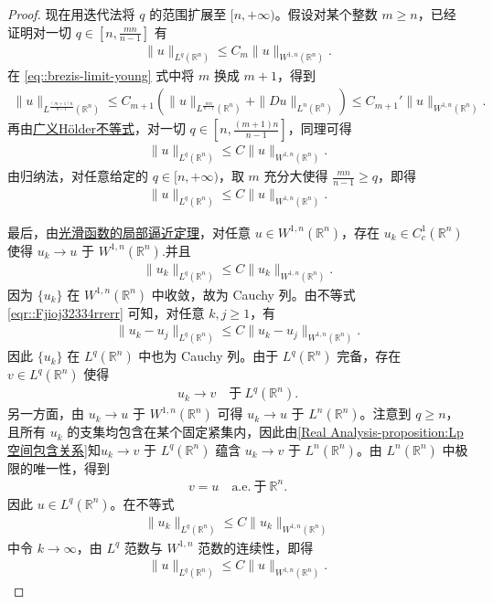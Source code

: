 \documentclass[../../main.tex]{subfiles}
\begin{document}
\begin{proof}
现在用迭代法将 $q$ 的范围扩展至 $[n, +\infty)$。假设对某个整数 $m \geqslant n$，已经证明对一切 $q \in \left[n, \frac{mn}{n-1}\right]$ 有
\begin{align*}
\|u\|_{L^q(\mathbb{R}^n)} \leqslant C_m\|u\|_{W^{1,n}(\mathbb{R}^n)}.
\end{align*}
在 \eqref{eq::brezis-limit-young} 式中将 $m$ 换成 $m+1$，得到
\begin{align*}
\|u\|_{L^{\frac{(m+1)n}{n-1}}(\mathbb{R}^n)} \leqslant C_{m+1}\left(\|u\|_{L^{\frac{mn}{n-1}}(\mathbb{R}^n)} + \|Du\|_{L^n(\mathbb{R}^n)}\right) \leqslant C_{m+1}'\|u\|_{W^{1,n}(\mathbb{R}^n)}.
\end{align*}
再由\hyperref[theorem:广义Holder不等式]{广义Hölder不等式}，对一切 $q \in \left[n, \frac{(m+1)n}{n-1}\right]$，同理可得
\begin{align*}
\|u\|_{L^q(\mathbb{R}^n)} \leqslant C\|u\|_{W^{1,n}(\mathbb{R}^n)}.
\end{align*}
由归纳法，对任意给定的 $q \in [n, +\infty)$，取 $m$ 充分大使得 $\frac{mn}{n-1} \geqslant q$，即得
\begin{align}\label{eq::brezis-limit-final}
\|u\|_{L^q(\mathbb{R}^n)} \leqslant C\|u\|_{W^{1,n}(\mathbb{R}^n)}.
\end{align}

最后，由\hyperref[theorem:ch05-光滑函数的局部逼近定理]{光滑函数的局部逼近定理}，对任意 $u \in W^{1,n}(\mathbb{R}^n)$，存在 $u_k \in C_c^1(\mathbb{R}^n)$ 使得 $u_k \to u$ 于 $W^{1,n}(\mathbb{R}^n)$.并且
\begin{align}\label{eqr::Fjioj32334rrerr}
\|u_k\|_{L^q(\mathbb{R}^n)} \leqslant C\|u_k\|_{W^{1,n}(\mathbb{R}^n)}.
\end{align}
因为 $\{u_k\}$ 在 $W^{1,n}(\mathbb{R}^n)$ 中收敛，故为 Cauchy 列。由不等式\eqref{eqr::Fjioj32334rrerr}
可知，对任意 $k,j \geqslant 1$，有
\begin{align*}
\|u_k - u_j\|_{L^q(\mathbb{R}^n)} \leqslant C\|u_k - u_j\|_{W^{1,n}(\mathbb{R}^n)}.
\end{align*}
因此 $\{u_k\}$ 在 $L^q(\mathbb{R}^n)$ 中也为 Cauchy 列。由于 $L^q(\mathbb{R}^n)$ 完备，存在 $v \in L^q(\mathbb{R}^n)$ 使得
\begin{align*}
u_k \to v \quad \text{于} \ L^q(\mathbb{R}^n).
\end{align*}
另一方面，由 $u_k \to u$ 于 $W^{1,n}(\mathbb{R}^n)$ 可得 $u_k \to u$ 于 $L^n(\mathbb{R}^n)$。注意到 $q \geqslant n$，且所有 $u_k$ 的支集均包含在某个固定紧集内，因此由\cref{Real Analysis-proposition:Lp空间包含关系}知$u_k \to v$ 于 $L^q(\mathbb{R}^n)$ 蕴含 $u_k \to v$ 于 $L^n(\mathbb{R}^n)$。由 $L^n(\mathbb{R}^n)$ 中极限的唯一性，得到
\begin{align*}
v = u \quad \text{a.e.} \ \text{于} \ \mathbb{R}^n.
\end{align*}
因此 $u \in L^q(\mathbb{R}^n)$。在不等式
\begin{align*}
\|u_k\|_{L^q(\mathbb{R}^n)} \leqslant C\|u_k\|_{W^{1,n}(\mathbb{R}^n)}
\end{align*}
中令 $k \to \infty$，由 $L^q$ 范数与 $W^{1,n}$ 范数的连续性，即得
\begin{align*}
\|u\|_{L^q(\mathbb{R}^n)} \leqslant C\|u\|_{W^{1,n}(\mathbb{R}^n)}.
\end{align*}
\end{proof}
\end{document}

